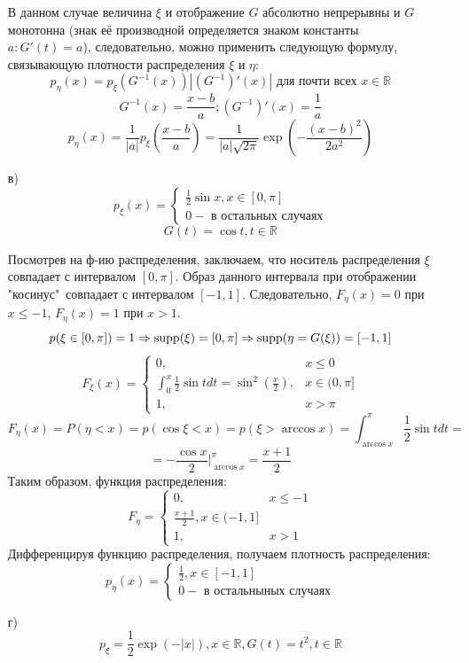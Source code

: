 \begin{enumerate}
	В данном случае величина $\xi$ и отображение $G$ абсолютно непрерывны и $G$ монотонна (знак её производной определяется знаком константы $a: G'(t)=a$), следовательно, можно применить следующую формулу, связывающую плотности распределения $\xi$ и $\eta$:
	\[ p_{\eta} (x) = p_{\xi} (G^{-1}(x)) | (G^{-1})'(x)| \text{ для почти всех } x \in \mathbb{R} \]
	\[ G^{-1}(x) = \frac{x-b}{a}; (G^{-1})'(x) = \frac{1}{a} \]
	\[ p_{\eta}(x) = \frac{1}{|a|} p_{\xi} \left(\frac{x-b}{a}\right) = \frac{1}{|a|\sqrt{2 \pi}} \exp \left(-\frac{(x-b)^2}{2a^2}\right) \]
	
	\item[в)]
	\[
	p_{\xi}(x) =
	\begin{cases}
		\frac{1}{2} \sin x, x \in [0, \pi] \\
		0 - \text{ в остальных случаях}
	\end{cases}
	\]
	\[ G(t) = \cos t, t \in \mathbb{R} \]
	
	Посмотрев на ф-ию распределения, заключаем, что носитель распределения $\xi$ совпадает с интервалом $[0,\pi]$. Образ данного интервала при отображении "косинус"\, совпадает с интервалом $[-1,1]$. Следовательно, $F_{\eta}(x) = 0$ при $x \le -1$, $F_{\eta}(x) = 1$ при  $x > 1$.
	\[ p(\xi \in [0,\pi]) = 1 \Rightarrow \operatorname{supp} (\xi) = [0,\pi] \Rightarrow \operatorname{supp} (\eta = G(\xi)) = [-1,1] \]
	\[
	F_{\xi}(x) =
	\begin{cases}
		0, &x \le 0 \\
		\int_{0}^{x} \frac{1}{2} \sin t dt = \sin^2 \left(\frac{x}{2}\right), &x \in (0,\pi] \\
		1, &x > \pi
		\end{cases}
	\]
	\[ F_{\eta}(x) = P(\eta < x) = p(\cos \xi < x) = p(\xi > \arccos x) = \int_{\arccos x}^{\pi} \frac{1}{2} \sin t dt =\] 
	\[ = - \frac{\cos x}{2} \bigg|_{\arccos x}^{\pi} = \frac{x+1}{2} \]
	Таким образом, функция распределения:
	\[
	F_{\eta} =
	\begin{cases}
		0, &x \le -1 \\
		\frac{x+1}{2}, x \in (-1,1] \\
		1, &x > 1
	\end{cases}
	\]
	Дифференцируя функцию распределения, получаем плотность распределения:
	\[
	p_{\eta}(x) =
	\begin{cases}
		\frac{1}{2}, x \in [-1,1] \\
		0 - \text{ в остальныных случаях}
	\end{cases}
	\]
	
	\item[г)]
	\[ p_{\xi} = \frac{1}{2} \exp (-|x|), x \in \mathbb{R}, G(t) = t^2, t \in \mathbb{R} \]
	

\end{enumerate}
